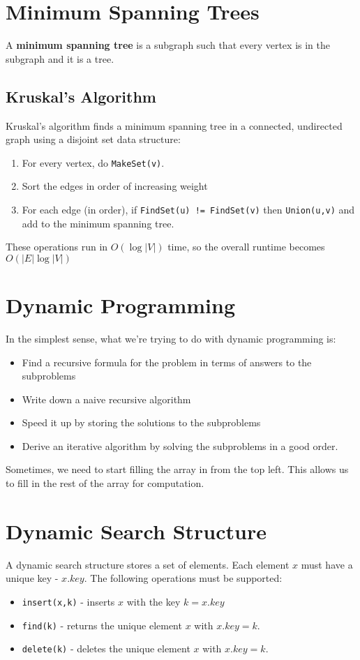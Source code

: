 \documentclass[11pt,fleqn,a4paper,titlepage,dvipsnames,cmyk]{scrartcl}
\begin{document}
\section{Minimum Spanning Trees}%
\label{sec:min-span-trees}
A \textbf{minimum spanning tree} is a subgraph such that every vertex is
in the subgraph and it is a tree.

\subsection{Kruskal's Algorithm}%
\label{sub:kruskal}
Kruskal's algorithm finds a minimum spanning tree in a connected,
undirected graph using a disjoint set data structure:
\begin{enumerate}
    \item For every vertex, do \texttt{MakeSet(v)}.
    \item Sort the edges in order of increasing weight
    \item For each edge (in order), if \texttt{FindSet(u) != FindSet(v)}
        then \texttt{Union(u,v)} and add to the minimum spanning tree.
\end{enumerate}

These operations run in $O(\log|V|)$ time, so the overall runtime becomes
$O(|E| \log |V|)$

\section{Dynamic Programming}%
\label{sec:dynamic-programming}
In the simplest sense, what we're trying to do with dynamic programming
is:
\begin{itemize}
    \item Find a recursive formula for the problem in terms of answers to
        the subproblems
    \item Write down a naive recursive algorithm
    \item Speed it up by storing the solutions to the subproblems
    \item Derive an iterative algorithm by solving the subproblems in a
        good order.
\end{itemize}

Sometimes, we need to start filling the array in from the top left. This
allows us to fill in the rest of the array for computation.

\section{Dynamic Search Structure}%
\label{sec:Dynamic Search Structure}
A dynamic search structure stores a set of elements. Each element $x$ must
have a unique key - $x.key$. The following operations must be supported:
\begin{itemize}
    \item \texttt{insert(x,k)} - inserts $x$ with the key $k=x.key$
    \item \texttt{find(k)} - returns the unique element $x$ with $x.key =
        k$.
    \item \texttt{delete(k)} - deletes the unique element $x$ with $x.key
        = k$.
\end{itemize}
\end{document}
